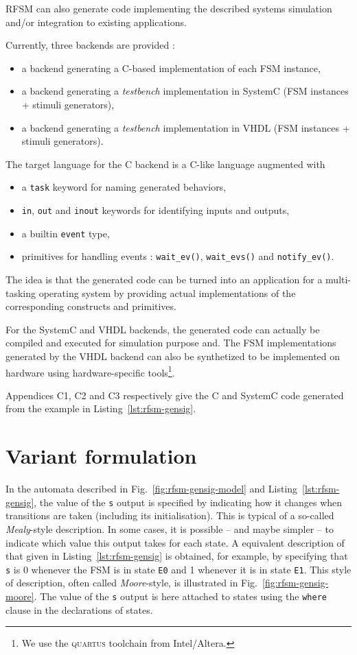 RFSM can also generate code implementing the described systems simulation and/or
integration to existing applications.

\medskip
Currently, three backends are provided :
\begin{itemize}
\item a backend generating a C-based implementation of each FSM instance,
\item a backend generating a \emph{testbench} implementation in SystemC (FSM instances + stimuli
  generators),
\item a backend generating a \emph{testbench} implementation in VHDL (FSM instances + stimuli
  generators).
\end{itemize}

\medskip
The target language for the C backend is a C-like language augmented with
\begin{itemize}
\item a \verb|task| keyword for naming generated behaviors,
\item \verb|in|, \verb|out| and \verb|inout| keywords for identifying inputs and outputs,
\item a builtin \verb|event| type,
\item primitives for handling events : \verb|wait_ev()|, \verb|wait_evs()| and
  \verb|notify_ev()|. 
\end{itemize}
The idea is that the generated code can be turned into an application for a multi-tasking operating
system by providing actual implementations of the corresponding constructs and primitives.

\medskip
For the SystemC and VHDL backends, the generated code can actually be compiled and executed for
simulation purpose and. The FSM implementations generated by the VHDL backend can also be
synthetized to be implemented on hardware using hardware-specific tools\footnote{We use the
  \textsc{quartus} toolchain from Intel/Altera.}. 

\medskip
Appendices C1, C2 and C3 respectively give the C and SystemC code generated from the example in
Listing~\ref{lst:rfsm-gensig}. 

\section*{Variant formulation}
\label{sec:variant-formulation}

In the automata described in Fig.~\ref{fig:rfsm-gensig-model} and Listing~\ref{lst:rfsm-gensig}, the
value of the \texttt{s} output is specified by indicating how it changes when transitions are taken
(including its initialisation). This is typical of a so-called \emph{Mealy}-style description.  In
some cases, it is possible -- and maybe simpler -- to indicate which value this output takes for
each state. A equivalent description of that given
in Listing~\ref{lst:rfsm-gensig} is obtained, for example, by specifying that \texttt{s} is 0
whenever the FSM is in state \texttt{E0} and 1 whenever it is in state \texttt{E1}.
This style of description, often called
\emph{Moore}-style, is illustrated in Fig.~\ref{fig:rfsm-gensig-moore}. The value of the \texttt{s}
output is here attached to states using the \texttt{where} clause in the declarations of states.

